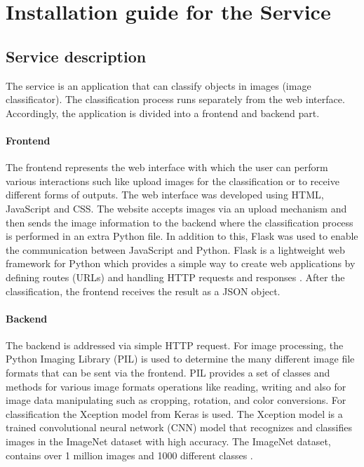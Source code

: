 \chapter{Installation guide for the Service}

\section{Service description}
The service is an application that can classify objects in images (image classificator). The classification process runs separately from the web interface. Accordingly, the application is divided into a frontend and backend part.

\subsubsection{Frontend}
The frontend represents the web interface with which the user can perform various interactions such like upload images for the classification or to receive different forms of outputs. The web interface was developed using HTML, JavaScript and CSS. The website accepts images via an upload mechanism and then sends the image information to the backend where the classification process is performed in an extra Python file. In addition to this, Flask was used to enable the communication between JavaScript and Python. Flask is a lightweight web framework for Python which provides a simple way to create web applications by defining routes (URLs) and handling HTTP requests and responses \cite{Flask:2010}. After  the classification, the frontend receives the result as a JSON object. 

\subsubsection{Backend}
The backend is addressed via simple HTTP request. For image processing, the Python Imaging Library (PIL) is used to determine the many different image file formats that can be sent via the frontend. PIL provides a set of classes and methods for various image formats operations like reading, writing and also for image data manipulating such as cropping, rotation, and color conversions. For classification the Xception model from Keras is used. The Xception model is a trained convolutional neural network (CNN) model that recognizes and classifies images in the ImageNet dataset with high accuracy. The ImageNet dataset, contains over 1 million images and 1000 different classes \cite{Xception:2017}.

